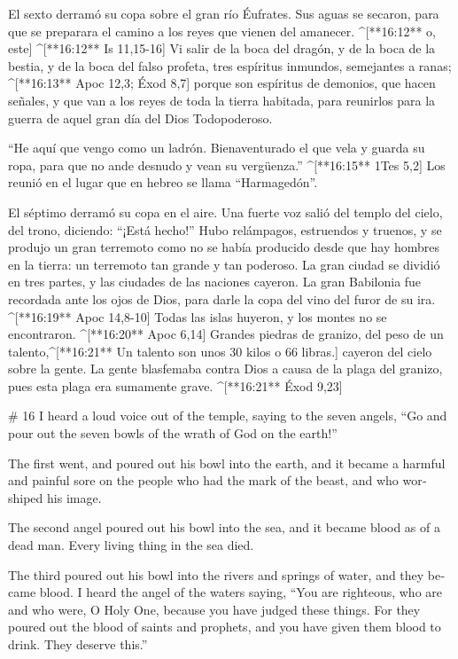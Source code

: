 \begin{paracols}{2}
 El sexto derramó su copa sobre el gran río Éufrates. Sus aguas se secaron, para que se preparara el camino a los reyes que vienen del amanecer. ^[**16:12** o, este] ^[**16:12** Is 11,15-16]  Vi salir de la boca del dragón, y de la boca de la bestia, y de la boca del falso profeta, tres espíritus inmundos, semejantes a ranas; ^[**16:13** Apoc 12,3; Éxod 8,7]  porque son espíritus de demonios, que hacen señales, y que van a los reyes de toda la tierra habitada, para reunirlos para la guerra de aquel gran día del Dios Todopoderoso.

 “He aquí que vengo como un ladrón. Bienaventurado el que vela y guarda su ropa, para que no ande desnudo y vean su vergüenza.” ^[**16:15** 1Tes 5,2]  Los reunió en el lugar que en hebreo se llama “Harmagedón”.

 El séptimo derramó su copa en el aire. Una fuerte voz salió del templo del cielo, del trono, diciendo: “¡Está hecho!”  Hubo relámpagos, estruendos y truenos, y se produjo un gran terremoto como no se había producido desde que hay hombres en la tierra: un terremoto tan grande y tan poderoso.  La gran ciudad se dividió en tres partes, y las ciudades de las naciones cayeron. La gran Babilonia fue recordada ante los ojos de Dios, para darle la copa del vino del furor de su ira. ^[**16:19** Apoc 14,8-10]  Todas las islas huyeron, y los montes no se encontraron. ^[**16:20** Apoc 6,14]  Grandes piedras de granizo, del peso de un talento,^[**16:21** Un talento son unos 30 kilos o 66 libras.] cayeron del cielo sobre la gente. La gente blasfemaba contra Dios a causa de la plaga del granizo, pues esta plaga era sumamente grave. ^[**16:21** Éxod 9,23]

\switchcolumn
\begin{english}

# 16
 I heard a loud voice out of the temple, saying to the seven angels, “Go and pour out the seven bowls of the wrath of God on the earth!” 

 The first went, and poured out his bowl into the earth, and it became a harmful and painful sore on the people who had the mark of the beast, and who worshiped his image. 

 The second angel poured out his bowl into the sea, and it became blood as of a dead man. Every living thing in the sea died. 

 The third poured out his bowl into the rivers and springs of water, and they became blood.  I heard the angel of the waters saying, “You are righteous, who are and who were, O Holy One, because you have judged these things.  For they poured out the blood of saints and prophets, and you have given them blood to drink. They deserve this.” 


\end{english}
\end{paracols}

